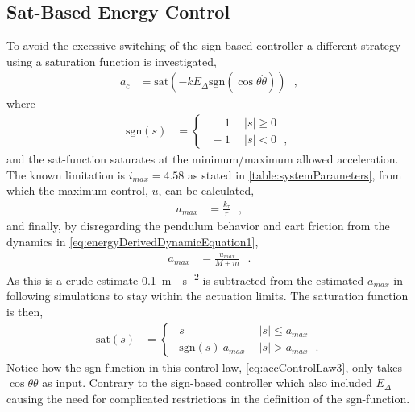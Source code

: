 \subsection{Sat-Based Energy Control}
To avoid the excessive switching of the sign-based controller a different strategy using a saturation function is investigated,
\begin{align}
  a_c &= \mathrm{sat}(-k E_\Delta \mathrm{sgn}(\cos \theta \dot{\theta}))  \ \ \ ,   \label{eq:accControlLaw3} 
\end{align}
where 
\begin{align}
\mathrm{sgn}( s ) &=
\begin{cases}
\ \ \phantom{-}1 & \ \  | s |  \geq 0 \\
\ \           -1 & \ \  | s |  <    0 \ \ \ ,
\end{cases}
\label{eq:sgnFunction1}
\end{align}
and the sat-function saturates at the minimum/maximum allowed acceleration. The known limitation is $i_{max} = 4.58$ as stated in \autoref{table:systemParameters}, from which the maximum control, $u$, can be calculated,
\begin{align}
  u_{max} &=  \frac{k_{\tau}}{r} \ \ \ ,    \label{eq:maxU} 
\end{align}
and finally, by disregarding the pendulum behavior and cart friction from the dynamics in \autoref{eq:energyDerivedDynamicEquation1},
\begin{align}
  a_{max} &= \frac{u_{max}}{M+m} \ \ \ .   \label{eq:maxAcc} 
\end{align}
As this is a crude estimate \SI{0.1}{m\cdot s^{-2}} is subtracted from the estimated $a_{max}$ in following simulations to stay within the actuation limits. The saturation function is then,
\begin{align}
  \text{sat}(s) &=
  \begin{cases}
    \ \ s                           & \ \  | s |  \leq a_{max} \\
    \ \ \mathrm{sgn}( s )\ a_{max}  & \ \  | s |  >  a_{max} \ \ \ .
  \end{cases}
  \label{eq:satuationFunction}
\end{align}
Notice how the sgn-function in this control law, \autoref{eq:accControlLaw3}, only takes $\cos \theta \dot{\theta}$ as input. Contrary to the sign-based controller which also included $E_\Delta$ causing the need for complicated restrictions in the definition of the sgn-function.

